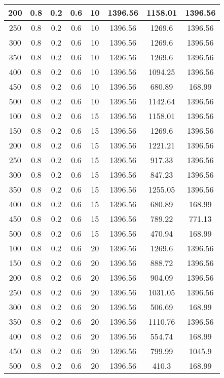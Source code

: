\documentclass[a4paper, 12pt]{extreport}
\begin{document}
\begin{itemize}
\begin{longtable}{|c|c|c|c|c|c|c|c|}
			200 & 0.8 & 0.2 & 0.6 & 10 & 1396.56 & 1158.01 & 1396.56 \\\hline
			250 & 0.8 & 0.2 & 0.6 & 10 & 1396.56 & 1269.6 & 1396.56 \\\hline
			300 & 0.8 & 0.2 & 0.6 & 10 & 1396.56 & 1269.6 & 1396.56 \\\hline
			350 & 0.8 & 0.2 & 0.6 & 10 & 1396.56 & 1269.6 & 1396.56 \\\hline
			400 & 0.8 & 0.2 & 0.6 & 10 & 1396.56 & 1094.25 & 1396.56 \\\hline
			450 & 0.8 & 0.2 & 0.6 & 10 & 1396.56 & 680.89 & 168.99 \\\hline
			500 & 0.8 & 0.2 & 0.6 & 10 & 1396.56 & 1142.64 & 1396.56 \\\hline
			100 & 0.8 & 0.2 & 0.6 & 15 & 1396.56 & 1158.01 & 1396.56 \\\hline
			150 & 0.8 & 0.2 & 0.6 & 15 & 1396.56 & 1269.6 & 1396.56 \\\hline
			200 & 0.8 & 0.2 & 0.6 & 15 & 1396.56 & 1221.21 & 1396.56 \\\hline
			250 & 0.8 & 0.2 & 0.6 & 15 & 1396.56 & 917.33 & 1396.56 \\\hline
			300 & 0.8 & 0.2 & 0.6 & 15 & 1396.56 & 847.23 & 1396.56 \\\hline
			350 & 0.8 & 0.2 & 0.6 & 15 & 1396.56 & 1255.05 & 1396.56 \\\hline
			400 & 0.8 & 0.2 & 0.6 & 15 & 1396.56 & 680.89 & 168.99 \\\hline
			450 & 0.8 & 0.2 & 0.6 & 15 & 1396.56 & 789.22 & 771.13 \\\hline
			500 & 0.8 & 0.2 & 0.6 & 15 & 1396.56 & 470.94 & 168.99 \\\hline
			100 & 0.8 & 0.2 & 0.6 & 20 & 1396.56 & 1269.6 & 1396.56 \\\hline
			150 & 0.8 & 0.2 & 0.6 & 20 & 1396.56 & 888.72 & 1396.56 \\\hline
			200 & 0.8 & 0.2 & 0.6 & 20 & 1396.56 & 904.09 & 1396.56 \\\hline
			250 & 0.8 & 0.2 & 0.6 & 20 & 1396.56 & 1031.05 & 1396.56 \\\hline
			300 & 0.8 & 0.2 & 0.6 & 20 & 1396.56 & 506.69 & 168.99 \\\hline
			350 & 0.8 & 0.2 & 0.6 & 20 & 1396.56 & 1110.76 & 1396.56 \\\hline
			400 & 0.8 & 0.2 & 0.6 & 20 & 1396.56 & 554.74 & 168.99 \\\hline
			450 & 0.8 & 0.2 & 0.6 & 20 & 1396.56 & 799.99 & 1045.9 \\\hline
			500 & 0.8 & 0.2 & 0.6 & 20 & 1396.56 & 410.3 & 168.99 \\\hline

\end{longtable}
\end{itemize}
\end{document}
